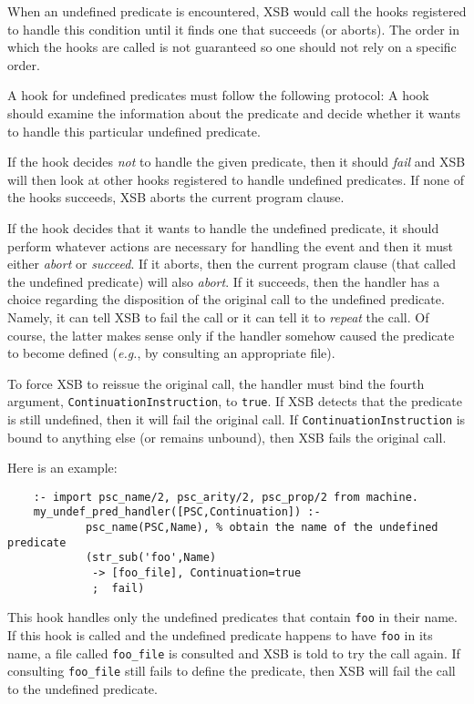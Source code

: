 \begin{description}
When an undefined predicate is encountered, XSB would call the hooks
registered to handle this condition until it finds one that succeeds (or
aborts). The order in which the hooks are called is not guaranteed so one
should not rely on a specific order.

A hook for undefined predicates must follow the following protocol: A hook
should examine the information about the predicate and decide whether it
wants to handle this particular undefined predicate.

If the hook decides \emph{not} to handle the given
predicate, then it should \emph{fail} and XSB will then look at other hooks
registered to handle undefined predicates. If none of the hooks succeeds,
XSB aborts the current program clause.

If the hook decides that it wants to handle the undefined predicate, it
should perform whatever actions are necessary for handling the event and
then it must either \emph{abort} or \emph{succeed}.  If it aborts, then the
current program clause (that called the undefined predicate) will also
\emph{abort}.  If it succeeds, then the handler has a choice regarding the
disposition of the original call to the undefined predicate. Namely, it can
tell XSB to fail the call or it can tell it to \emph{repeat} the call. Of
course, the latter makes sense only if the handler somehow caused the
predicate to become defined ({\it e.g.}, by consulting an appropriate
file).

To force XSB to reissue the original call, the handler must bind the fourth
argument, {\tt ContinuationInstruction}, to {\tt true}. If XSB detects that
the predicate is still undefined, then it will fail the original call.  If
{\tt ContinuationInstruction} is bound to anything else (or remains
unbound), then XSB fails the original call.

Here is an example:
\begin{verbatim}
    :- import psc_name/2, psc_arity/2, psc_prop/2 from machine.
    my_undef_pred_handler([PSC,Continuation]) :-
            psc_name(PSC,Name), % obtain the name of the undefined predicate
            (str_sub('foo',Name)
             -> [foo_file], Continuation=true
             ;  fail)
\end{verbatim}
This hook handles only the undefined predicates that contain {\tt foo} in
their name.  If this hook is called and the undefined predicate happens to
have {\tt foo} in its name, a file called {\tt foo\_file} is consulted and
XSB is told to try the call again. If consulting {\tt foo\_file} still
fails to define the predicate, then XSB will fail the call to the undefined
predicate.



\end{description}
